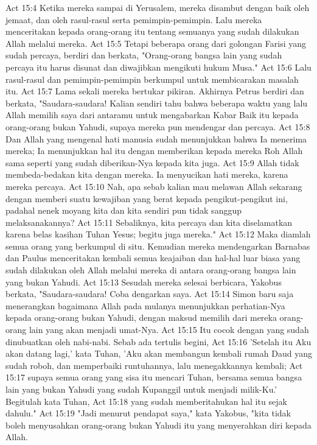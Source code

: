 Act 15:4  Ketika mereka sampai di Yerusalem, mereka disambut dengan baik oleh jemaat, dan oleh rasul-rasul serta pemimpin-pemimpin. Lalu mereka menceritakan kepada orang-orang itu tentang semuanya yang sudah dilakukan Allah melalui mereka.
Act 15:5  Tetapi beberapa orang dari golongan Farisi yang sudah percaya, berdiri dan berkata, "Orang-orang bangsa lain yang sudah percaya itu harus disunat dan diwajibkan mengikuti hukum Musa."
Act 15:6  Lalu rasul-rasul dan pemimpin-pemimpin berkumpul untuk membicarakan masalah itu.
Act 15:7  Lama sekali mereka bertukar pikiran. Akhirnya Petrus berdiri dan berkata, "Saudara-saudara! Kalian sendiri tahu bahwa beberapa waktu yang lalu Allah memilih saya dari antaramu untuk mengabarkan Kabar Baik itu kepada orang-orang bukan Yahudi, supaya mereka pun mendengar dan percaya.
Act 15:8  Dan Allah yang mengenal hati manusia sudah menunjukkan bahwa Ia menerima mereka; Ia menunjukkan hal itu dengan memberikan kepada mereka Roh Allah sama seperti yang sudah diberikan-Nya kepada kita juga.
Act 15:9  Allah tidak membeda-bedakan kita dengan mereka. Ia menyucikan hati mereka, karena mereka percaya.
Act 15:10  Nah, apa sebab kalian mau melawan Allah sekarang dengan memberi suatu kewajiban yang berat kepada pengikut-pengikut ini, padahal nenek moyang kita dan kita sendiri pun tidak sanggup melaksanakannya?
Act 15:11  Sebaliknya, kita percaya dan kita diselamatkan karena belas kasihan Tuhan Yesus; begitu juga mereka."
Act 15:12  Maka diamlah semua orang yang berkumpul di situ. Kemudian mereka mendengarkan Barnabas dan Paulus menceritakan kembali semua keajaiban dan hal-hal luar biasa yang sudah dilakukan oleh Allah melalui mereka di antara orang-orang bangsa lain yang bukan Yahudi.
Act 15:13  Sesudah mereka selesai berbicara, Yakobus berkata, "Saudara-saudara! Coba dengarkan saya.
Act 15:14  Simon baru saja menerangkan bagaimana Allah pada mulanya menunjukkan perhatian-Nya kepada orang-orang bukan Yahudi, dengan maksud memilih dari mereka orang-orang lain yang akan menjadi umat-Nya.
Act 15:15  Itu cocok dengan yang sudah dinubuatkan oleh nabi-nabi. Sebab ada tertulis begini,
Act 15:16  'Setelah itu Aku akan datang lagi,' kata Tuhan, 'Aku akan membangun kembali rumah Daud yang sudah roboh, dan memperbaiki runtuhannya, lalu menegakkannya kembali;
Act 15:17  supaya semua orang yang sisa itu mencari Tuhan, bersama semua bangsa lain yang bukan Yahudi yang sudah Kupanggil untuk menjadi milik-Ku.' Begitulah kata Tuhan,
Act 15:18  yang sudah memberitahukan hal itu sejak dahulu."
Act 15:19  "Jadi menurut pendapat saya," kata Yakobus, "kita tidak boleh menyusahkan orang-orang bukan Yahudi itu yang menyerahkan diri kepada Allah.
